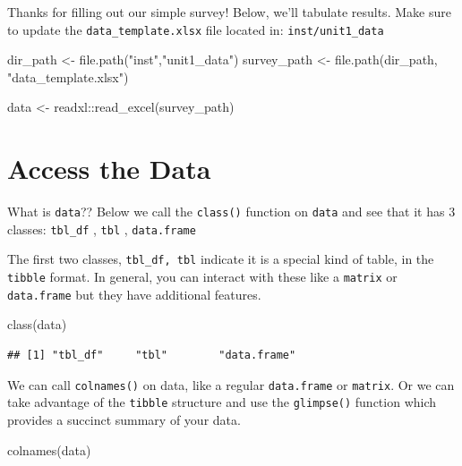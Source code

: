 \documentclass[
]{book}
\newenvironment{Shaded}{\begin{snugshade}}{\end{snugshade}}
\newcommand{\FunctionTok}[1]{\textcolor[rgb]{0.00,0.00,0.00}{#1}}
\newcommand{\NormalTok}[1]{#1}
\newcommand{\OtherTok}[1]{\textcolor[rgb]{0.56,0.35,0.01}{#1}}
\newcommand{\SpecialCharTok}[1]{\textcolor[rgb]{0.00,0.00,0.00}{#1}}
\newcommand{\StringTok}[1]{\textcolor[rgb]{0.31,0.60,0.02}{#1}}
\begin{document}
Thanks for filling out our simple survey! Below, we'll tabulate results. Make sure to update the \texttt{data\_template.xlsx} file located in: \texttt{inst/unit1\_data}

\begin{Shaded}
\begin{Highlighting}[]
\NormalTok{dir\_path }\OtherTok{\textless{}{-}} \FunctionTok{file.path}\NormalTok{(}\StringTok{"inst"}\NormalTok{,}\StringTok{"unit1\_data"}\NormalTok{)}
\NormalTok{survey\_path }\OtherTok{\textless{}{-}} \FunctionTok{file.path}\NormalTok{(dir\_path, }\StringTok{"data\_template.xlsx"}\NormalTok{)}

\NormalTok{data }\OtherTok{\textless{}{-}}\NormalTok{ readxl}\SpecialCharTok{::}\FunctionTok{read\_excel}\NormalTok{(survey\_path)}
\end{Highlighting}
\end{Shaded}

\hypertarget{access-the-data-1}{%
\chapter*{Access the Data}\label{access-the-data-1}}

What is \texttt{data}?? Below we call the \texttt{class()} function on \texttt{data} and see that it has 3 classes:
\texttt{tbl\_df} , \texttt{tbl} , \texttt{data.frame}

The first two classes, \texttt{tbl\_df,\ tbl} indicate it is a special kind of table, in the \texttt{tibble} format. In general, you can interact with these like a \texttt{matrix} or \texttt{data.frame} but they have additional features.

\begin{Shaded}
\begin{Highlighting}[]
\FunctionTok{class}\NormalTok{(data)}
\end{Highlighting}
\end{Shaded}

\begin{verbatim}
## [1] "tbl_df"     "tbl"        "data.frame"
\end{verbatim}

We can call \texttt{colnames()} on data, like a regular \texttt{data.frame} or \texttt{matrix}. Or we can take advantage of the \texttt{tibble} structure and use the \texttt{glimpse()} function which provides a succinct summary of your data.

\begin{Shaded}
\begin{Highlighting}[]
\FunctionTok{colnames}\NormalTok{(data)}
\end{Highlighting}
\end{Shaded}
\end{document}
